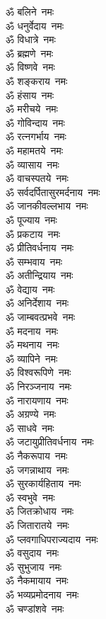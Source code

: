 \begin{multicols}{2}
\begin{flushleft}
ॐ बलिने~नमः\\
ॐ धनुर्वेदाय~नमः\\
ॐ विधात्रे~नमः\\
ॐ ब्रह्मणे~नमः\\
ॐ विष्णवे~नमः\hfill{}\\
ॐ शङ्कराय~नमः\\
ॐ हंसाय~नमः\\
ॐ मरीचये~नमः\\
ॐ गोविन्दाय~नमः\\
ॐ रत्नगर्भाय~नमः\\
ॐ महामतये~नमः\\
ॐ व्यासाय~नमः\\
ॐ वाचस्पतये~नमः\\
ॐ सर्वदर्पितासुरमर्दनाय~नमः\\
ॐ जानकीवल्लभाय~नमः\hfill{}\\
ॐ पूज्याय~नमः\\
ॐ प्रकटाय~नमः\\
ॐ प्रीतिवर्धनाय~नमः\\
ॐ सम्भवाय~नमः\\
ॐ अतीन्द्रियाय~नमः\\
ॐ वेद्याय~नमः\\
ॐ अनिर्देशाय~नमः\\
ॐ जाम्बवत्प्रभवे~नमः\\
ॐ मदनाय~नमः\\
ॐ मथनाय~नमः\hfill{}\\
ॐ व्यापिने~नमः\\
ॐ विश्वरूपिणे~नमः\\
ॐ निरञ्जनाय~नमः\\
ॐ नारायणाय~नमः\\
ॐ अग्रण्ये~नमः\\
ॐ साधवे~नमः\\
ॐ जटायुप्रीतिवर्धनाय~नमः\\
ॐ नैकरूपाय~नमः\\
ॐ जगन्नाथाय~नमः\\
ॐ सुरकार्यहिताय~नमः\hfill{}\\
ॐ स्वभुवे~नमः\\
ॐ जितक्रोधाय~नमः\\
ॐ जितारातये~नमः\\
ॐ प्लवगाधिपराज्यदाय~नमः\\
ॐ वसुदाय~नमः\\
ॐ सुभुजाय~नमः\\
ॐ नैकमायाय~नमः\\
ॐ भव्यप्रमोदनाय~नमः\\
ॐ चण्डांशवे~नमः\\

\end{flushleft}
\end{multicols}
